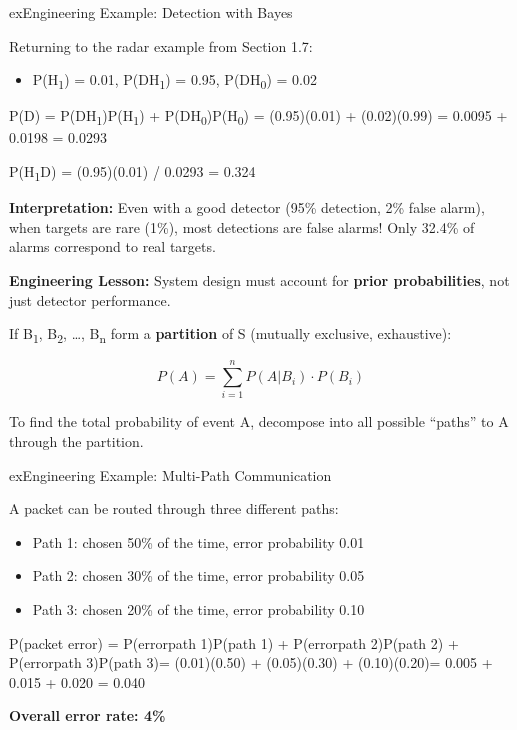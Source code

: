 \begin{PSbox}[unbreakable]{ex}{Engineering Example: Detection with Bayes}

Returning to the radar example from Section 1.7:

\begin{itemize}
\tightlist
\item
  P(H\textsubscript{1}) = 0.01, P(D\textbar{}H\textsubscript{1}) = 0.95, P(D\textbar{}H\textsubscript{0}) = 0.02
\end{itemize}

P(D) = P(D\textbar{}H\textsubscript{1})P(H\textsubscript{1}) + P(D\textbar{}H\textsubscript{0})P(H\textsubscript{0}) = (0.95)(0.01) + (0.02)(0.99) = 0.0095 + 0.0198 = 0.0293

P(H\textsubscript{1}\textbar{}D) = (0.95)(0.01) / 0.0293 = 0.324

\textbf{Interpretation:} Even with a good detector (95\% detection, 2\% false alarm), when targets are rare (1\%), most detections are false alarms! Only 32.4\% of alarms correspond to real targets.

\textbf{Engineering Lesson:} System design must account for \textbf{prior probabilities}, not just detector performance.

\end{PSbox}



If B\textsubscript{1}, B\textsubscript{2}, …, B\textsubscript{n} form a \textbf{partition} of S (mutually exclusive, exhaustive):

\[P(A) = \sum_{i=1}^{n} P(A|B_i) \cdot P(B_i)\]


To find the total probability of event A, decompose into all possible ``paths'' to A through the partition.

\begin{PSbox}[unbreakable]{ex}{Engineering Example: Multi-Path Communication}

A packet can be routed through three different paths:

\begin{itemize}
\tightlist
\item
  Path 1: chosen 50\% of the time, error probability 0.01
\item
  Path 2: chosen 30\% of the time, error probability 0.05
\item
  Path 3: chosen 20\% of the time, error probability 0.10
\end{itemize}

P(packet error) = P(error\textbar{}path 1)P(path 1) + P(error\textbar{}path 2)P(path 2) + P(error\textbar{}path 3)P(path 3)\PSbr{}= (0.01)(0.50) + (0.05)(0.30) + (0.10)(0.20)\PSbr{}= 0.005 + 0.015 + 0.020 = 0.040

\textbf{Overall error rate: 4\%}

\end{PSbox}

